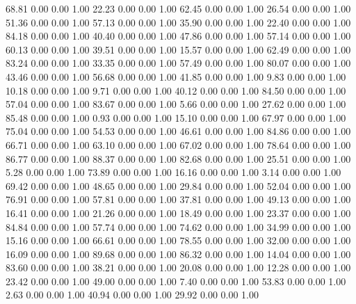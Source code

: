    68.81   0.00   0.00   1.00
   22.23   0.00   0.00   1.00
   62.45   0.00   0.00   1.00
   26.54   0.00   0.00   1.00
   51.36   0.00   0.00   1.00
   57.13   0.00   0.00   1.00
   35.90   0.00   0.00   1.00
   22.40   0.00   0.00   1.00
   84.18   0.00   0.00   1.00
   40.40   0.00   0.00   1.00
   47.86   0.00   0.00   1.00
   57.14   0.00   0.00   1.00
   60.13   0.00   0.00   1.00
   39.51   0.00   0.00   1.00
   15.57   0.00   0.00   1.00
   62.49   0.00   0.00   1.00
   83.24   0.00   0.00   1.00
   33.35   0.00   0.00   1.00
   57.49   0.00   0.00   1.00
   80.07   0.00   0.00   1.00
   43.46   0.00   0.00   1.00
   56.68   0.00   0.00   1.00
   41.85   0.00   0.00   1.00
    9.83   0.00   0.00   1.00
   10.18   0.00   0.00   1.00
    9.71   0.00   0.00   1.00
   40.12   0.00   0.00   1.00
   84.50   0.00   0.00   1.00
   57.04   0.00   0.00   1.00
   83.67   0.00   0.00   1.00
    5.66   0.00   0.00   1.00
   27.62   0.00   0.00   1.00
   85.48   0.00   0.00   1.00
    0.93   0.00   0.00   1.00
   15.10   0.00   0.00   1.00
   67.97   0.00   0.00   1.00
   75.04   0.00   0.00   1.00
   54.53   0.00   0.00   1.00
   46.61   0.00   0.00   1.00
   84.86   0.00   0.00   1.00
   66.71   0.00   0.00   1.00
   63.10   0.00   0.00   1.00
   67.02   0.00   0.00   1.00
   78.64   0.00   0.00   1.00
   86.77   0.00   0.00   1.00
   88.37   0.00   0.00   1.00
   82.68   0.00   0.00   1.00
   25.51   0.00   0.00   1.00
    5.28   0.00   0.00   1.00
   73.89   0.00   0.00   1.00
   16.16   0.00   0.00   1.00
    3.14   0.00   0.00   1.00
   69.42   0.00   0.00   1.00
   48.65   0.00   0.00   1.00
   29.84   0.00   0.00   1.00
   52.04   0.00   0.00   1.00
   76.91   0.00   0.00   1.00
   57.81   0.00   0.00   1.00
   37.81   0.00   0.00   1.00
   49.13   0.00   0.00   1.00
   16.41   0.00   0.00   1.00
   21.26   0.00   0.00   1.00
   18.49   0.00   0.00   1.00
   23.37   0.00   0.00   1.00
   84.84   0.00   0.00   1.00
   57.74   0.00   0.00   1.00
   74.62   0.00   0.00   1.00
   34.99   0.00   0.00   1.00
   15.16   0.00   0.00   1.00
   66.61   0.00   0.00   1.00
   78.55   0.00   0.00   1.00
   32.00   0.00   0.00   1.00
   16.09   0.00   0.00   1.00
   89.68   0.00   0.00   1.00
   86.32   0.00   0.00   1.00
   14.04   0.00   0.00   1.00
   83.60   0.00   0.00   1.00
   38.21   0.00   0.00   1.00
   20.08   0.00   0.00   1.00
   12.28   0.00   0.00   1.00
   23.42   0.00   0.00   1.00
   49.00   0.00   0.00   1.00
    7.40   0.00   0.00   1.00
   53.83   0.00   0.00   1.00
    2.63   0.00   0.00   1.00
   40.94   0.00   0.00   1.00
   29.92   0.00   0.00   1.00
